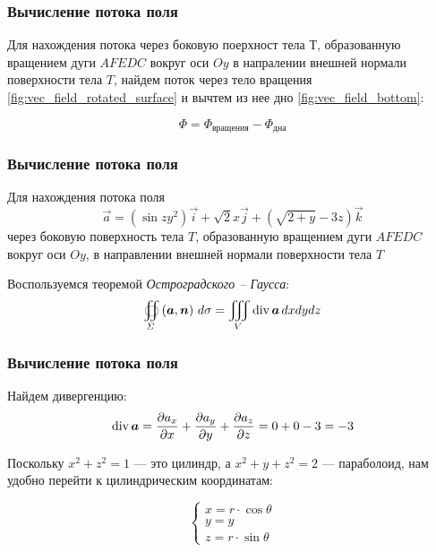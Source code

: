 \begin{frame}\frametitle{Вычисление потока поля}
  Для нахождения потока через боковую поерхност тела \(Т\), образованную вращением дуги \(AFEDC\) вокруг оси \(Oy\) в напралении внешней нормали поверхности тела \(T\), найдем поток через тело вращения \ref{fig:vec_field_rotated_surface} и вычтем из нее дно \ref{fig:vec_field_bottom}:

	\begin{equation*}
		\Phi = \Phi_{\text{вращения}} - \Phi_{\text{дна}}
	\end{equation*}


\end{frame}

\begin{frame}\frametitle{Вычисление потока поля}
	Для нахождения потока поля
	\begin{equation*}
		\vec a = (\sin zy^2) \vec i + \sqrt{2} x \vec j + (\sqrt{2+y} -3z) \vec k
	\end{equation*}
	через боковую поверхность тела \(T\), образованную вращением дуги \(AFEDC\)
	вокруг оси \(Oy\), в направлении внешней нормали поверхности тела \(T\)

	Воспользуемся теоремой \textit{Остроградского -- Гаусса}:
	\begin{equation*}
		\oiint\limits_{\Sigma}\left( \vec {a}, \vec {n} \right) \, d\sigma = \iiint\limits_V \Div \vec {a} \, dxdydz
	\end{equation*}
\end{frame}

\begin{frame}\frametitle{Вычисление потока поля}
	Найдем дивергенцию:
	\begin{equation*}
		\Div \vec a = \frac{\partial a_x}{\partial x} +  \frac{\partial a_y}{\partial y} +  \frac{\partial a_z}{\partial z} = 0 + 0 - 3 = -3
	\end{equation*}

	Поскольку $x^2 + z^2 = 1$ — это цилиндр, а $x^2 + y + z^2 = 2$ — параболоид, нам удобно перейти к цилиндрическим координатам:

	\begin{equation*}
		\begin{cases}
			x = r \cdot \cos \theta \\
			y = y                   \\
			z = r \cdot \sin \theta
		\end{cases}
	\end{equation*}

\end{frame}

